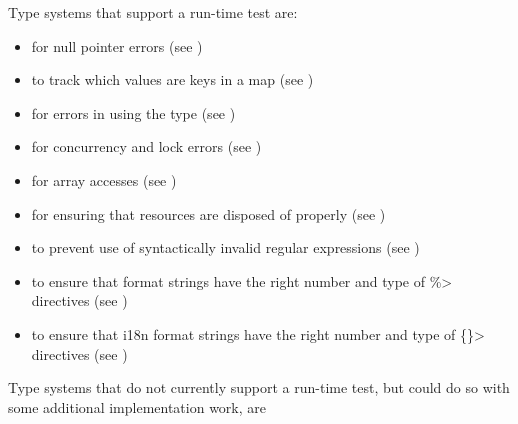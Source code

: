 
Type systems that support a run-time test are:
\begin{itemize}
\item
   for null pointer errors
  (see )
\item
   to track which values are
  keys in a map (see )
\item
   for errors in using the
   type (see
  )
\item
   for concurrency and lock errors
  (see )
\item
   for array accesses
  (see )
\item
   for ensuring that resources are disposed of properly
  (see )
\item
   to prevent use of syntactically
  invalid regular expressions (see )
\item
   to ensure that format
  strings have the right number and type of \<\%> directives (see
  )
\item
  to ensure that i18n format strings have the right number and type of
  \<\{\}> directives (see )
\end{itemize}


Type systems that do not currently support a run-time test, but could do so with some
additional implementation work, are


